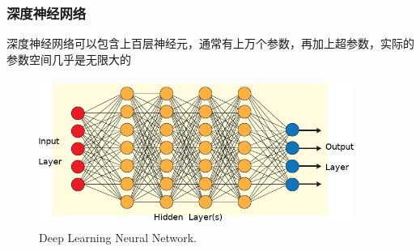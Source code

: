 \frame
{
	\frametitle{深度神经网络}
深度神经网络可以包含上百层神经元，通常有上万个参数，再加上超参数，实际的参数空间几乎是无限大的%
\begin{figure}[h!]
\centering
\includegraphics[height=1.90in,width=4.05in]{Figures/ANN_Algorithm.png}
\caption{\tiny \textrm{Deep Learning Neural Network.}}%
\label{Fig:Deep-Learning-NN}
\end{figure}
}
%

